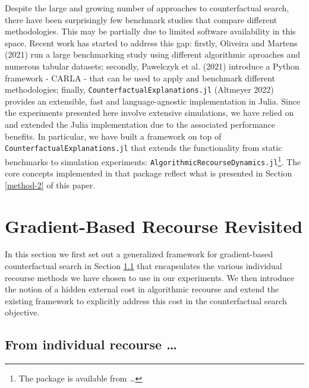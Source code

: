 \documentclass[conference,final,]{IEEEtran}
\begin{document}
Despite the large and growing number of approaches to counterfactual search, there have been surprisingly few benchmark studies that compare different methodologies. This may be partially due to limited software availability in this space. Recent work has started to address this gap: firstly, Oliveira and Martens (2021) run a large benchmarking study using different algorithmic aproaches and numerous tabular datasets; secondly, Pawelczyk et al. (2021) introduce a Python framework - CARLA - that can be used to apply and benchmark different methodologies; finally, \texttt{CounterfactualExplanations.jl} (Altmeyer 2022) provides an extensible, fast and language-agnostic implementation in Julia. Since the experiments presented here involve extensive simulations, we have relied on and extended the Julia implementation due to the associated performance benefits. In particular, we have built a framework on top of \texttt{CounterfactualExplanations.jl} that extends the functionality from static benchmarks to simulation experiments: \texttt{AlgorithmicRecourseDynamics.jl}\footnote{The package is available from \ldots{}}. The core concepts implemented in that package reflect what is presented in Section \ref{method-2} of this paper.

\hypertarget{method}{%
\section{Gradient-Based Recourse Revisited}\label{method}}

In this section we first set out a generalized framework for gradient-based counterfactual search in Section \ref{method-general} that encapsulates the various individual recourse methods we have chosen to use in our experiments. We then introduce the notion of a hidden external cost in algorithmic recourse and extend the existing framework to explicitly address this cost in the counterfactual search objective.

\hypertarget{method-general}{%
\subsection{From individual recourse \ldots{}}\label{method-general}}
\end{document}
